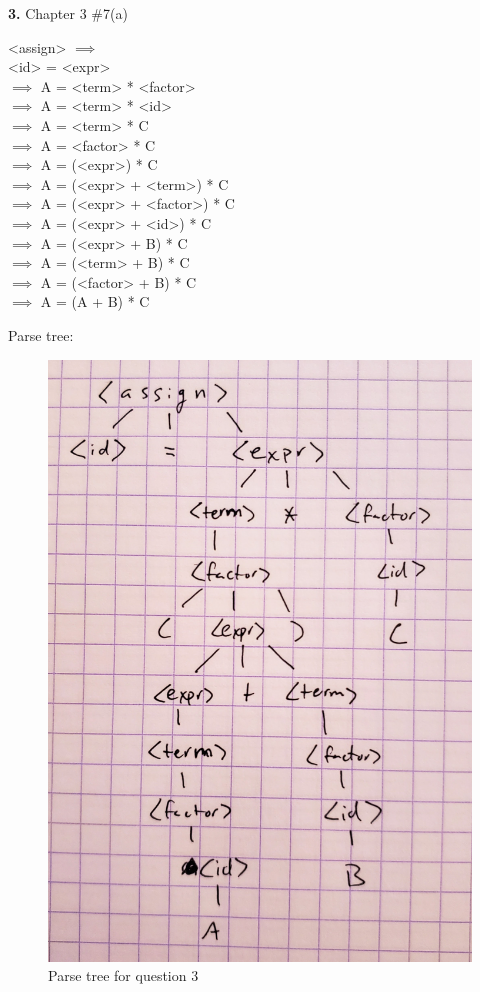 \documentclass[letterpaper, 11pt]{article}
\newcommand{\hwnumbersec}[2]{\medskip \noindent\textbf{#1.} Chapter 3 \##2 \smallskip}
\begin{document}
\newpage
\hwnumbersec{3}{7(a)}

\begin{minipage}{0.8\textwidth}
\centering
\begin{grammar}
	<assign> $\implies$\\
	<id> = <expr> \\
	$\implies$ A = <term> * <factor> \\
	$\implies$ A = <term> * <id>\\
	$\implies$ A = <term> * C\\
	$\implies$ A = <factor> * C\\
	$\implies$ A = (<expr>) * C\\
	$\implies$ A = (<expr> + <term>) * C\\
	$\implies$ A = (<expr> + <factor>) * C\\
	$\implies$ A = (<expr> + <id>) * C\\
	$\implies$ A = (<expr> + B) * C\\
	$\implies$ A = (<term> + B) * C\\
	$\implies$ A = (<factor> + B) * C\\
	$\implies$ A = (A + B) * C
\end{grammar}
\end{minipage}

Parse tree:
\begin{figure}[h]
\centering
\includegraphics[scale=0.07]{hw02tree3.jpg}
\caption{Parse tree for question 3}
\label{fig:tree3}
\end{figure}
\end{document}
